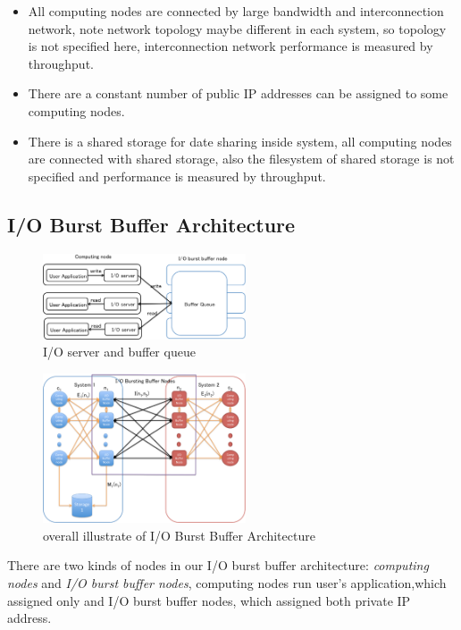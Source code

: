 \begin{itemize}
	\item All computing nodes are connected by large bandwidth and interconnection network, note network topology maybe different in each system, so topology is not specified here, interconnection network performance is measured by throughput.
	\item There are a constant number of public IP addresses can be assigned to some computing nodes.
	\item There is a shared storage for date sharing inside system, all computing nodes are connected with shared storage, also the filesystem of shared storage is not specified and performance is measured by throughput.
\end{itemize}

\subsection{I/O Burst Buffer Architecture}

\begin{figure}[tb]
	\centering
	\includegraphics[width=6cm]{../img/IOserver}
	\caption{I/O server and buffer queue}
	\label{I/O server}
\end{figure}

\begin{figure}[tb]
	\centering
	\includegraphics[width=6cm]{../img/overview}
	\caption{overall illustrate of I/O Burst Buffer Architecture}
	\label{overview}
\end{figure}

There are two kinds of nodes in our I/O burst buffer architecture: \emph{computing nodes} and \emph{I/O burst buffer nodes}, computing nodes run user's application,which assigned only  and I/O burst buffer nodes, which assigned both private IP address.

